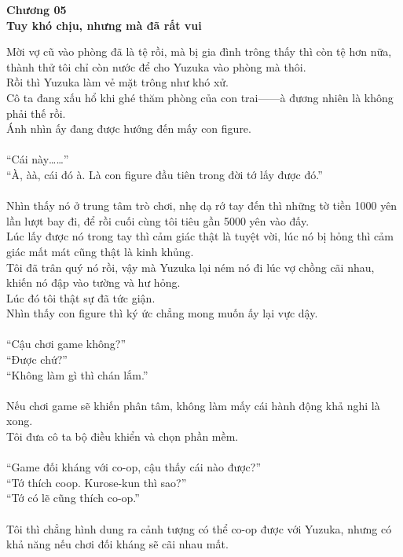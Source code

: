 \documentclass[12pt,a4paper, twosides]{book}
\begin{document}
    \begin{center}
    \textbf{\large Chương 05 \\ Tuy khó chịu, nhưng mà đã rất vui}
    \end{center}
    \noindent
Mời vợ cũ vào phòng đã là tệ rồi, mà bị gia đình trông thấy thì còn tệ hơn nữa, thành thử tôi chỉ còn nước để cho Yuzuka vào phòng mà thôi.\\
Rồi thì Yuzuka làm vẻ mặt trông như khó xử.\\
Cô ta đang xấu hổ khi ghé thăm phòng của con trai——à đương nhiên là không phải thế rồi.\\
Ánh nhìn ấy đang được hướng đến mấy con figure.\\
\\
“Cái này……”\\
“À, àà, cái đó à. Là con figure đầu tiên trong đời tớ lấy được đó.”\\
\\
Nhìn thấy nó ở trung tâm trò chơi, nhẹ dạ rớ tay đến thì những tờ tiền 1000 yên lần lượt bay đi, để rồi cuối cùng tôi tiêu gần 5000 yên vào đấy.\\
Lúc lấy được nó trong tay thì cảm giác thật là tuyệt vời, lúc nó bị hỏng thì cảm giác mất mát cũng thật là kinh khủng.\\
Tôi đã trân quý nó rồi, vậy mà Yuzuka lại ném nó đi lúc vợ chồng cãi nhau, khiến nó đập vào tường và hư hỏng.\\
Lúc đó tôi thật sự đã tức giận.\\
Nhìn thấy con figure thì ký ức chẳng mong muốn ấy lại vực dậy.\\
\\
“Cậu chơi game không?”\\
“Được chứ?”\\
“Không làm gì thì chán lắm.”\\
\\
Nếu chơi game sẽ khiến phân tâm, không làm mấy cái hành động khả nghi là xong.\\
Tôi đưa cô ta bộ điều khiển và chọn phần mềm.\\
\\
“Game đối kháng với co-op, cậu thấy cái nào được?”\\
“Tớ thích coop. Kurose-kun thì sao?”\\
“Tớ có lẽ cũng thích co-op.”\\
\\
Tôi thì chẳng hình dung ra cảnh tượng có thể co-op được với Yuzuka, nhưng có khả năng nếu chơi đối kháng sẽ cãi nhau mất.\\
\end{document}

